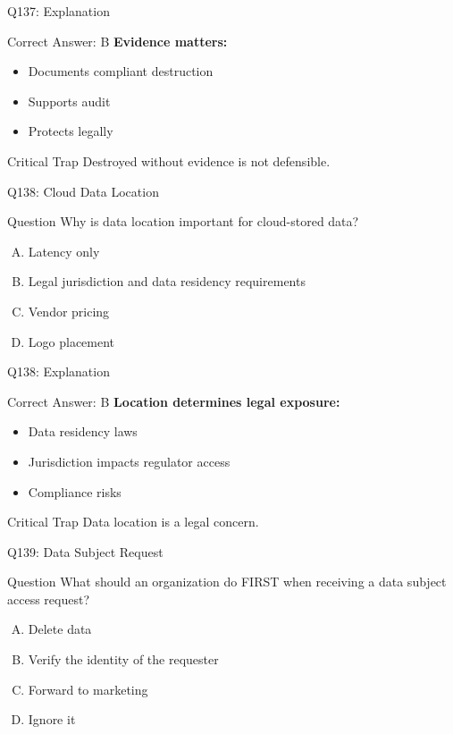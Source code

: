 \documentclass{beamer}
\begin{document}
	\begin{frame}{Q137: Explanation}
		\begin{block}{Correct Answer: B}
			\textbf{Evidence matters:}
			\begin{itemize}
				\item Documents compliant destruction
				\item Supports audit
				\item Protects legally
			\end{itemize}
		\end{block}
		\begin{alertblock}{Critical Trap}
			Destroyed without evidence is not defensible.
		\end{alertblock}
	\end{frame}
	
	\begin{frame}{Q138: Cloud Data Location}
		\begin{block}{Question}
			Why is data location important for cloud-stored data?
		\end{block}
		\begin{enumerate}[(A)]
			\item Latency only
			\item Legal jurisdiction and data residency requirements
			\item Vendor pricing
			\item Logo placement
		\end{enumerate}
	\end{frame}
	
	\begin{frame}{Q138: Explanation}
		\begin{block}{Correct Answer: B}
			\textbf{Location determines legal exposure:}
			\begin{itemize}
				\item Data residency laws
				\item Jurisdiction impacts regulator access
				\item Compliance risks
			\end{itemize}
		\end{block}
		\begin{alertblock}{Critical Trap}
			Data location is a legal concern.
		\end{alertblock}
	\end{frame}
	
	\begin{frame}{Q139: Data Subject Request}
		\begin{block}{Question}
			What should an organization do FIRST when receiving a data subject access request?
		\end{block}
		\begin{enumerate}[(A)]
			\item Delete data
			\item Verify the identity of the requester
			\item Forward to marketing
			\item Ignore it
		\end{enumerate}
	\end{frame}
	
\end{document}
